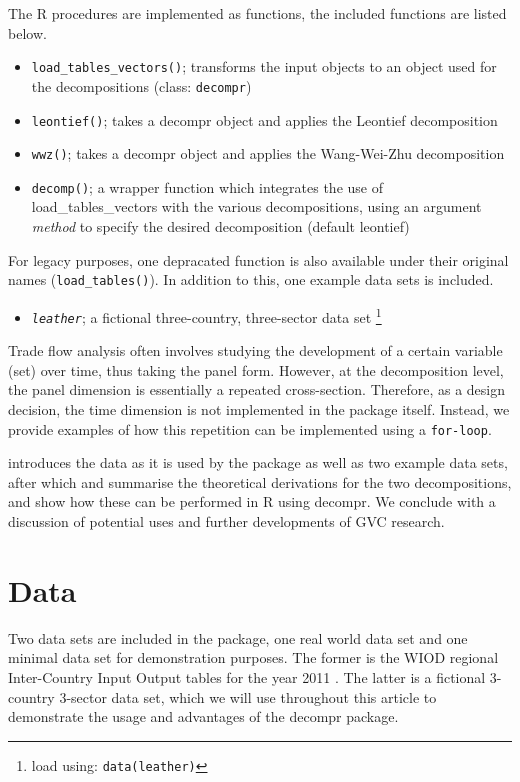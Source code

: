 \documentclass[a4paper]{article}\usepackage[]{graphicx}\usepackage[]{color}
\newcommand{\code}[1]{\texttt{#1}}
\begin{document}
The R procedures are implemented as functions, the included functions
are listed below.
\begin{itemize}
\item \code{load\_tables\_vectors()}; transforms the input objects to an
object used for the decompositions (class: \code{decompr}) 
\item \code{leontief()}; takes a decompr object and applies the Leontief
decomposition 
\item \code{wwz()}; takes a decompr object and applies the Wang-Wei-Zhu
decomposition 
\item \code{decomp()}; a wrapper function which integrates the use of load\_tables\_vectors
with the various decompositions, using an argument \textit{method}
to specify the desired decomposition (default leontief) 
\end{itemize}
For legacy purposes, one depracated function is also available under
their original names (\code{load\_tables()}). In addition to this,
one example data sets is included.
\begin{itemize}
\item \code{\textit{\emph{leather}}}; a fictional three-country, three-sector
data set \footnote{load using: \code{data(leather)}}
\end{itemize}
Trade flow analysis often involves studying the development of a certain
variable (set) over time, thus taking the panel form. However, at
the decomposition level, the panel dimension is essentially a repeated
cross-section. Therefore, as a design decision, the time dimension
is not implemented in the package itself. Instead, we provide examples
of how this repetition can be implemented using a \code{for-loop}.

 introduces the data as it is used by the package
as well as two example data sets, after which 
and  summarise the theoretical derivations for
the two decompositions, and show how these can be performed in R using
decompr. We conclude with a discussion of potential uses and further
developments of GVC research.

\section{Data}

\label{sec:data} Two data sets are included in the package, one real
world data set and one minimal data set for demonstration purposes.
The former is the WIOD regional Inter-Country Input Output tables
for the year 2011 \citep{timmer2012world}. The latter is a fictional
3-country 3-sector data set, which we will use throughout this article
to demonstrate the usage and advantages of the decompr package.
\end{document}

